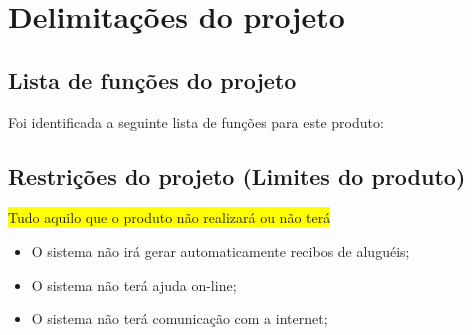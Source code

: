 \section{Delimitações do projeto}

    \subsection{Lista de funções do projeto}
    
        Foi identificada a seguinte lista de funções para este produto:
        
        
        
    \subsection{Restrições do projeto (Limites do produto)}
    
        \colorbox{yellow}{Tudo aquilo que o produto não realizará ou não terá}
        
        
        \begin{itemize}
            
            \item O sistema não irá gerar automaticamente recibos de aluguéis;
            \item O sistema não terá ajuda on-line;
            \item O sistema não terá comunicação com a internet;
        
        \end{itemize}